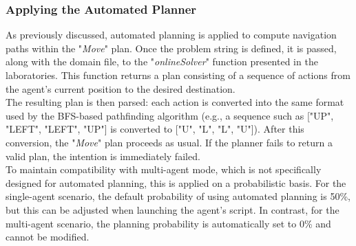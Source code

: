         \subsubsection{Applying the Automated Planner}
            As previously discussed, automated planning is applied to compute navigation paths within the "\textit{Move}" plan. Once the problem string is defined, it is passed, along with the domain file, to the "\textit{onlineSolver}" function presented in the laboratories. This function returns a plan consisting of a sequence of actions from the agent's current position to the desired destination.
            \medskip\\
            The resulting plan is then parsed: each action is converted into the same format used by the BFS-based pathfinding algorithm (e.g., a sequence such as ["UP", "LEFT", "LEFT", "UP"] is converted to ["U", "L", "L", "U"]). After this conversion, the "\textit{Move}" plan proceeds as usual. If the planner fails to return a valid plan, the intention is immediately failed.
            \medskip\\
            To maintain compatibility with multi-agent mode, which is not specifically designed for automated planning, this is applied on a probabilistic basis. For the single-agent scenario, the default probability of using automated planning is 50\%, but this can be adjusted when launching the agent's script. In contrast, for the multi-agent scenario, the planning probability is automatically set to 0\% and cannot be modified.

